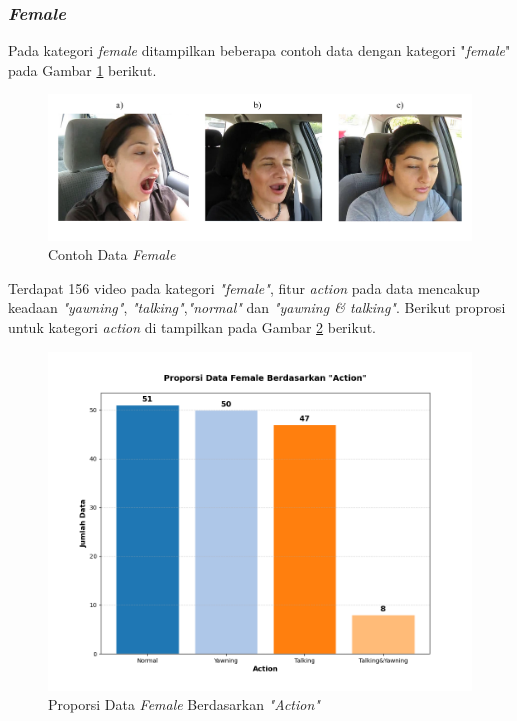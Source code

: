 \subsubsection{\textit{Female}}

    
    Pada kategori \textit{female} ditampilkan beberapa contoh data dengan kategori "\textit{female}" pada Gambar \ref{Female Dataset} berikut.
    
     \begin{figure}[H]
         \centering
         \includegraphics[width=1.0\linewidth]{figures/bab4/female_contoh.png}
         \caption{Contoh Data \textit{Female}}
         \label{Female Dataset}
     \end{figure}

   

     Terdapat 156 video pada kategori \textit{"female"}, fitur \textit{action} pada data mencakup keadaan \textit{"yawning"}, \textit{"talking"},\textit{"normal"} dan \textit{"yawning \& talking"}. Berikut proprosi untuk kategori \textit{action} di tampilkan pada Gambar \ref{Proporsi Data Female Berdasarkan "Action"} berikut.

     \begin{figure}[H]
         \centering
         \includegraphics[width=0.75\linewidth]{figures/bab4/data_female.png}
         \caption{Proporsi Data \textit{Female }Berdasarkan \textit{"Action"}}
         \label{Proporsi Data Female Berdasarkan "Action"}
     \end{figure}

